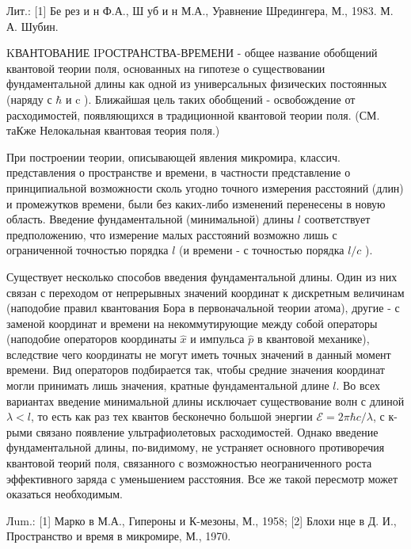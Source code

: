 \documentclass[10pt]{article}
\begin{document}
Лит.: [1] Бе рез и н Ф.А., Ш уб и н М.А., Уравнение Шредингера, М., 1983. М. А. Шубин.



KВАНТОВАНИЕ IPОСТРАНСТВА-ВРЕМЕНИ - общее название обобщений квантовой теории поля, основанных на гипотезе о существовании фундаментальной длины как одной из универсальных физических постоянных (наряду с $\hbar$ и c ). Ближайшая цель таких обобщений - освобождение от расходимостей, появляющихся в традиционной квантовой теории поля. (СМ. таКже Нелокальная квантовая теория поля.)



При построении теории, описывающей явления микромира, классич. представления о пространстве и времени, в частности представление о принципиальной возможности сколь угодно точного измерения расстояний (длин) и промежутков времени, были без каких-либо изменений перенесены в новую область. Введение фундаментальной (минимальной) длины $l$ соответствует предположению, что измерение малых расстояний возможно лишь с ограниченной точностью порядка $l$ (и времени - с точностью порядка $l / c$ ).



Существует несколько способов введения фундаментальной длины. Один из них связан с переходом от непрерывных значений координат к дискретным величинам (наподобие правил квантования Бора в первоначальной теории атома), другие - с заменой координат и времени на некоммутирующие между собой операторы (наподобие операторов координаты $\hat{x}$ и импульса $\hat{p}$ в квантовой механике), вследствие чего координаты не могут иметь точных значений в данный момент времени. Вид операторов подбирается так, чтобы средние значения координат могли принимать лишь значения, кратные фундаментальной длине $l$. Во всех вариантах введение минимальной длины исключает существование волн с длиной $\lambda<l$, то есть как раз тех квантов бесконечно большой энергии $\mathscr{E}=2 \pi \hbar c / \lambda$, с к-рыми связано появление ультрафиолетовых расходимостей. Однако введение фундаментальной длины, по-видимому, не устраняет основного противоречия квантовой теорий поля, связанного с возможностью неограниченного роста эффективного заряда с уменьшением расстояния. Все же такой пересмотр может оказаться необходимым.



Лum.: [1] Марко в М.А., Гипероны и К-мезоны, М., 1958; [2] Блохи нце в Д. И., Пространство и время в микромире, М., 1970.
\end{document}
